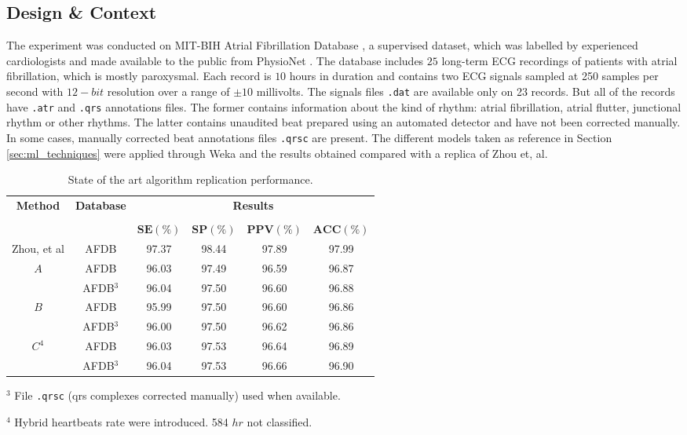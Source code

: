 \subsection{Design \& Context}
The experiment was conducted on MIT-BIH Atrial Fibrillation Database \cite{afdb}, a supervised dataset, which was labelled by experienced cardiologists and made available to the public from PhysioNet \cite{physionet}. The database includes $25$ long-term ECG recordings of patients with atrial fibrillation, which is mostly paroxysmal. Each record is $10$ hours in duration and contains two ECG signals sampled at 250 samples per second with $12-bit$ resolution over a range of $\pm 10$ millivolts. The signals files \verb|.dat| are available only on 23 records. But all of the records have \verb|.atr| and \verb|.qrs| annotations files. The former contains information about the kind of rhythm: atrial fibrillation, atrial flutter, junctional rhythm or other rhythms. The latter contains unaudited beat prepared using an automated detector and have not been corrected manually. In some cases, manually corrected beat annotations files \verb|.qrsc| are present.
The different models taken as reference in Section \ref{sec:ml_techniques} were applied through Weka and the results obtained compared with a replica of Zhou et, al. 
\begin{table}[h]
\begin{center}
\begin{threeparttable}
\caption[State of the art algorithm replication performance.]{State of the art algorithm replication performance.}
\label{table:zhou_hr_and_unimol}
\scriptsize
  \begin{tabular}{c c c c c c}
  \toprule
  \textbf{Method} & \textbf{Database} & \multicolumn{4}{c}{\textbf{Results}} \\
  \cline{3-6}
  \\
  & & $\mathbf{SE(\%)}$ & $\mathbf{SP(\%)}$ & $\mathbf{PPV(\%)}$ & $\mathbf{ACC(\%)}$\\
  \midrule  
  Zhou, et al\cite{zhou2015} & AFDB & 97.37 & 98.44 & 97.89 & 97.99 \\
  \hline
  $A$ & AFDB & 96.03 & 97.49 & 96.59 & 96.87 \\
  & AFDB$^3$ & 96.04 & 97.50 & 96.60 & 96.88 \\
  \hline
  $B$ & AFDB & 95.99 & 97.50 & 96.60 & 96.86 \\
  & AFDB$^3$ & 96.00 & 97.50 & 96.62 & 96.86 \\
  \hline
  $C^4$ & AFDB & 96.03 & 97.53 & 96.64 & 96.89 \\
  & AFDB$^3$ & 96.04 & 97.53 & 96.66 & 96.90 \\
  \bottomrule
\end{tabular}
\begin{tablenotes}
 	\item $^3$ File \verb|.qrsc| (qrs complexes corrected manually) used when available.
 	\item $^4$ Hybrid heartbeats rate were introduced. 584 $hr$ not classified.
    \end{tablenotes}
\end{threeparttable}
\end{center}
\end{table}
